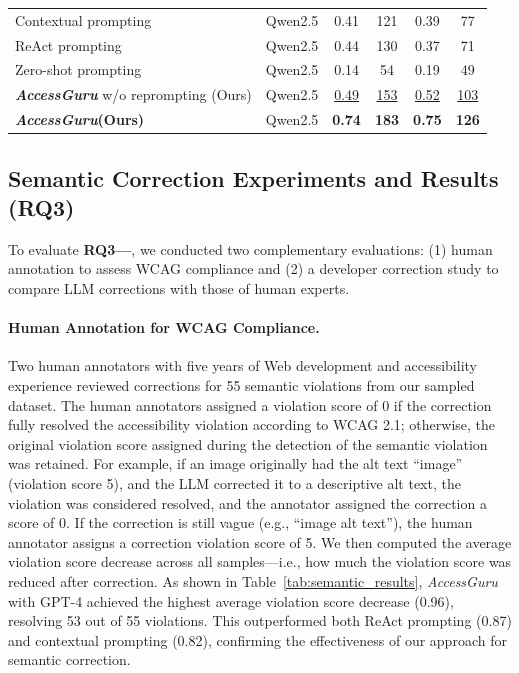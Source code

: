 \documentclass[sigconf, nonacm]{acmart}
\newcommand{\method}{\emph{AccessGuru}}
\begin{document}
\begin{table}[t]
{\begin{tabular}{|p{5cm}|c|cc|cc|}
Contextual prompting \cite{DBLP:conf/petra/OthmanDJ23} & Qwen2.5 & 0.41 & 121 & 0.39 & 77 \\
ReAct prompting \cite{DBLP:journals/corr/abs-2401-16450} & Qwen2.5 & 0.44 & 130 & 0.37 & 71 \\
Zero-shot prompting \cite{DBLP:conf/ccnc/DelnevoAM24} & Qwen2.5 & 0.14 & 54 & 0.19 & 49 \\
\textbf{\method} w/o reprompting (Ours) & Qwen2.5 & \underline{0.49} & \underline{153} & \underline{0.52} & \underline{103} \\
\textbf{\method \space (Ours)} & Qwen2.5 & \textbf{0.74} & \textbf{183} & \textbf{0.75} & \textbf{126} \\
\hline

\end{tabular}
}
\end{table}

\subsection{Semantic Correction Experiments and Results (RQ3)}

To evaluate \textbf{RQ3—}, we conducted two complementary evaluations: (1) human annotation to assess WCAG compliance and (2) a developer correction study to compare LLM corrections with those of human experts.

\paragraph{Human Annotation for WCAG Compliance.}
Two human annotators with five years of Web development and accessibility experience reviewed corrections for 55 semantic violations from our sampled dataset. The human annotators assigned a violation score of 0 if the correction fully resolved the accessibility violation according to WCAG 2.1; otherwise, the original violation score assigned during the detection of the semantic violation was retained. For example, if an image originally had the alt text “image” (violation score 5), and the LLM corrected it to a descriptive alt text, the violation was considered resolved, and the annotator assigned the correction a score of 0. If the correction is still vague (e.g., “image alt text”), the human annotator assigns a correction violation score of 5.  We then computed the average violation score decrease across all samples—i.e., how much the violation score was reduced after correction. As shown in Table~\ref{tab:semantic_results}, \method{} with GPT-4 achieved the highest average violation score decrease (0.96), resolving 53 out of 55 violations. This outperformed both ReAct prompting (0.87) and contextual prompting (0.82), confirming the effectiveness of our approach for semantic correction.
\end{document}
